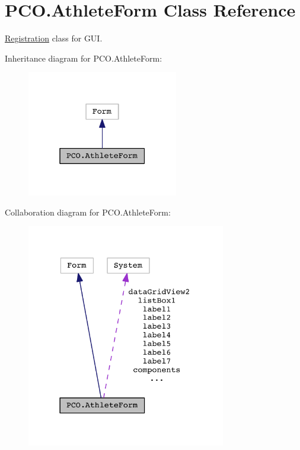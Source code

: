 \hypertarget{classPCO_1_1AthleteForm}{}\section{P\+C\+O.\+Athlete\+Form Class Reference}
\label{classPCO_1_1AthleteForm}


\hyperlink{classRegistration}{Registration} class for G\+UI.  




Inheritance diagram for P\+C\+O.\+Athlete\+Form\+:\nopagebreak
\begin{figure}[H]
\begin{center}
\leavevmode
\includegraphics[width=187pt]{classPCO_1_1AthleteForm__inherit__graph}
\end{center}
\end{figure}


Collaboration diagram for P\+C\+O.\+Athlete\+Form\+:\nopagebreak
\begin{figure}[H]
\begin{center}
\leavevmode
\includegraphics[width=246pt]{classPCO_1_1AthleteForm__coll__graph}
\end{center}
\end{figure}
